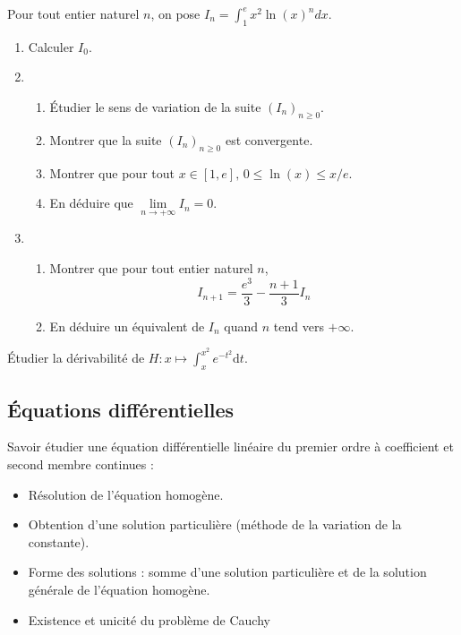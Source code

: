 \documentclass[a4paper,twoside,french,11pt]{VcCours}
\newcommand{\dt}{\text{d}t}
\begin{document}
\begin{Exercice}{}
  Pour tout entier naturel $n$, on pose $I_{n}=\int_{1}^{e}x^{2}\ln \left( x\right) ^{n}dx$.
  \begin{enumerate}
    \item  Calculer $I_0$.
    \item 
    \begin{enumerate}
      \item Étudier le sens de variation de la suite $(I_{n})_{n \geq 0}$.

      \item  Montrer que la suite $(I_{n})_{n \geq 0}$ est convergente.

      \item  Montrer que pour tout $x\in [1,e], \, 0 \leq \ln (x) \leq x/e$.

      \item  En déduire que $\lim\limits_{n\rightarrow +\infty }I_{n}=0$.
    \end{enumerate}
    \item 
    \begin{enumerate}
      \item  Montrer que pour tout entier naturel $\displaystyle n$, 
      $$I_{n+1}={
        \frac{e^{3}}{3}}-{\frac{n+1}{3}}I_{n}$$

        \item  En déduire un équivalent de $I_n$ quand $n$ tend vers $+ \infty$.        
    \end{enumerate}
  \end{enumerate}
\end{Exercice} 

\begin{Exercice}{}
  Étudier la dérivabilité de $H : x \mapsto \int_x^{x^2} e^{-t^2} \dt$.
\end{Exercice} 

\subsection{Équations différentielles}

\begin{ptc}{}
	Savoir étudier une équation différentielle linéaire du premier ordre à coefficient et second membre continues :
\begin{itemize} 
\item Résolution de l'équation homogène.
\item Obtention d'une solution particulière (méthode de la variation de la constante).
\item Forme des solutions : somme d'une solution particulière et de la solution générale de l'équation homogène.
\item Existence et unicité du problème de Cauchy
\end{itemize}
\end{ptc}
\end{document}
